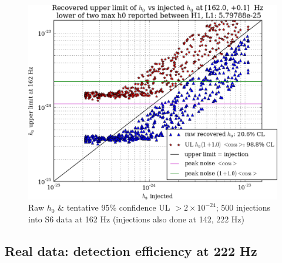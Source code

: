\begin{figure}
\begin{center}
\includegraphics[width=0.4\paperwidth,height=0.2\paperheight]{plots/h0UL-vs-h0injected-162-0Hz.eps}
\caption{
Raw $h_0$ \& tentative 95\% confidence UL $>2\times10^{-24}$; 500 injections
into S6 data at 162 Hz (injections also done at 142, 222 Hz)}
\end{center}
\end{figure}




\subsection{Real data: detection efficiency at 222 Hz}

